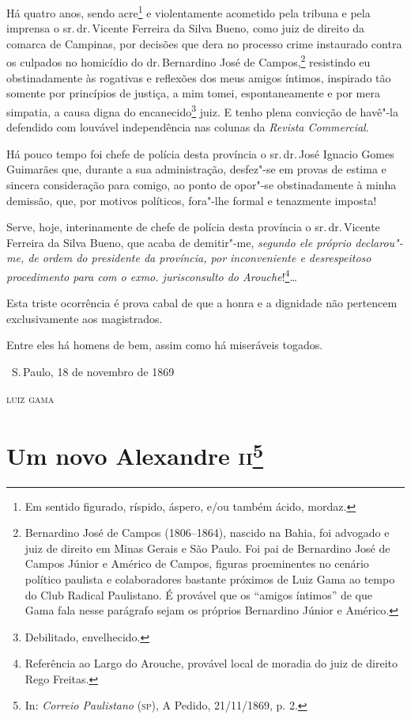 Há quatro anos, sendo acre\footnote{Em sentido figurado, ríspido,
  áspero, e/ou também ácido, mordaz.} e violentamente acometido pela
tribuna e pela imprensa o sr.\,dr.\,Vicente Ferreira da Silva Bueno, como
juiz de direito da comarca de Campinas, por decisões que dera no
processo crime instaurado contra os culpados no homicídio do dr.\,Bernardino José de Campos,\footnote{Bernardino José de Campos
  (1806--1864), nascido na Bahia, foi advogado e juiz de direito em Minas
  Gerais e São Paulo. Foi pai de Bernardino José de Campos Júnior e
  Américo de Campos, figuras proeminentes no cenário político paulista e
  colaboradores bastante próximos de Luiz Gama ao tempo do Club Radical
  Paulistano. É provável que os ``amigos íntimos'' de que Gama fala nesse
  parágrafo sejam os próprios Bernardino Júnior e Américo.} resistindo
eu obstinadamente às rogativas e reflexões dos meus amigos íntimos,
inspirado tão somente por princípios de justiça, a mim tomei,
espontaneamente e por mera simpatia, a causa digna do
encanecido\footnote{Debilitado, envelhecido.} juiz. E tenho plena
convicção de havê"-la defendido com louvável independência nas colunas da
\emph{Revista Commercial}.

Há pouco tempo foi chefe de polícia desta província o sr.\,dr.\,José
Ignacio Gomes Guimarães que, durante a sua administração, desfez"-se em
provas de estima e sincera consideração para comigo, ao ponto de opor"-se
obstinadamente à minha demissão, que, por motivos políticos, fora"-lhe
formal e tenazmente imposta!

Serve, hoje, interinamente de chefe de polícia desta província o sr.\,dr.\,Vicente Ferreira da Silva Bueno, que acaba de demitir"-me, \emph{segundo
ele próprio declarou"-me, de ordem do presidente da província, por
inconveniente e desrespeitoso procedimento para com o exmo.
jurisconsulto do Arouche}!\footnote{Referência ao Largo do Arouche,
  provável local de moradia do juiz de direito Rego Freitas.}\ldots{}

Esta triste ocorrência é
prova cabal de que a honra e a dignidade não pertencem exclusivamente
aos magistrados.

Entre eles há homens de bem, assim como há miseráveis togados.

\medskip

\hfill\ S.\,Paulo, 18 de novembro de 1869\smallskip

\hfill\textsc{luiz gama}


\chapter{Um novo Alexandre \textsc{ii}\footnote[*]{In: \emph{Correio Paulistano}
  (\textsc{sp}), A Pedido, 21/11/1869, p. 2.}}

